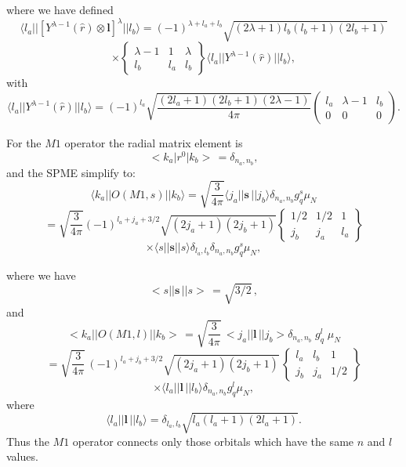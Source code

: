 \documentclass[graybox,sectrefs,envcountresetchap,open=right]{svmonodo}
\begin{document}
where we have defined
\[
\langle l _{a}\vert\vert [Y^{\lambda -1}(\hat{r})\otimes\mathbf{l}]^{\lambda }\vert\vert l _{b}\rangle=(-1)^{\lambda +l _{a}+l _{b}} \sqrt{(2\lambda +1)l _{b}(l _{b}+1)(2l _{b}+1)}
\]
\[
\times\left\{\begin{array}{ccc}  {\lambda -1} & {1}&  {\lambda}\\   {l _{b}}&  {l _{a}} &  {l _{b}} \end{array}\right\}
\langle l _{a}\vert\vert Y^{\lambda -1}(\hat{r})\vert\vert l _{b}\rangle,
\]
with
\[
\langle l _{a}\vert\vert Y^{\lambda -1}(\hat{r})\vert\vert l _{b}\rangle=(-1)^{l _{a}} \sqrt{\frac{(2l _{a}+1)(2l _{b}+1)(2\lambda -1)}{4\pi }}\left(\begin{array}{ccc}  {l _{a}} & {\lambda -1} & {l _{b}}\\  {0} & {0}&  {0}\end{array}\right)
. 
\]


For the $M1$ operator the radial matrix element is
\[
<k_{a}\vert r^{0}\vert k_{b}>\, = \delta _{n_{a},n_{b}},
\]
and the SPME simplify to:
\[
\langle k_{a}\vert\vert O(M1,s)\vert\vert k_{b}\rangle=\sqrt{ \frac{3}{4\pi }}\langle j_{a}\vert\vert \mathbf{s}\,\vert\vert j_{b}\rangle \delta _{n_{a},n_{b}}g^{s}_{q}\mu_{N}
\]
\[
=\sqrt{ \frac{3}{4\pi }}(-1)^{l _{a}+j_{a}+3/2}
\sqrt{(2j_{a}+1)(2j_{b}+1)}\left\{\begin{array}{ccc}  {1/2}&  {1/2} & {1} \\ {j_{b}} & {j_{a}}&  {l _{a}}\end{array}\right\}
\]
\[
\times\langle s\vert\vert \mathbf{s}\vert\vert s\rangle \delta _{l _{a},l _{b}} \delta _{n_{a},n_{b}}g^{s}_{q}\mu _{N},
\]


where we have
\[
<s\vert\vert \mathbf{s}\,\vert\vert s>\, = \sqrt{3/2}\, ,
\]
and
\[
<k_{a}\vert\vert O(M1,l )\vert\vert k_{b}>\, =
\sqrt{ \frac{3}{4\pi }}\,
<j_{a}\vert\vert \mathbf{l}\,\vert\vert j_{b}> \delta _{n_{a},n_{b}} \; g^{l }_{q} \; \mu _{N}
\]
\[
=\sqrt{ \frac{3}{4\pi }}\,
(-1)^{l _{a}+j_{b}+3/2} \sqrt{(2j_{a}+1)(2j_{b}+1)}\,
   \left\{\begin{array}{ccc}  {l _{a}}&  {l _{b}} & {1}\\  {j_{b}}&  {j_{a}}&  {1/2}\end{array}\right\}
\]
\[
\times\langle l _{a}\vert\vert \mathbf{l}\,\vert\vert l _{b}\rangle \delta _{n_{a},n_{b}}g^{l }_{q}\mu _{N} ,       
\]
where
\[
\langle l _{a}\vert\vert \mathbf{l}\,\vert\vert l _{b}\rangle = \delta _{l _{a},l _{b}} \sqrt{l _{a}(l_{a}+1)(2l _{a}+1)}.
\]
Thus the $M1$ operator connects only
those orbitals which have the same $n$ and $l$ values.
\end{document}
